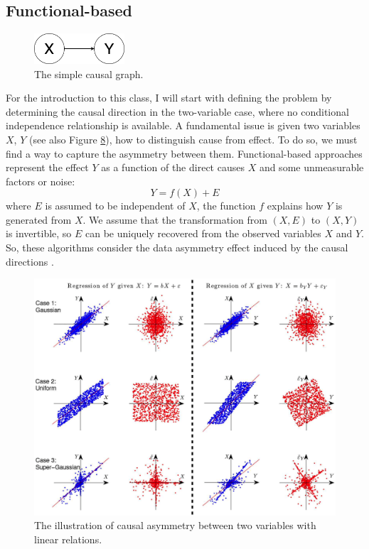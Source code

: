 \subsection{Functional-based}
\begin{figure}[H]
\centering
    \label{fig:x-y}
    \includegraphics[width=0.3\textwidth]{figures/x_y.png}
    \caption{The simple causal graph.}
\end{figure}
For the introduction to this class, I will start with defining the problem by determining the causal direction in the two-variable case, where no conditional independence relationship is available. A fundamental issue is given two variables $X$, $Y$ (see also Figure \hyperref[fig:x-y]{8}), how to distinguish cause from effect. To do so, we must find a way to capture the asymmetry between them. Functional-based approaches represent the effect $Y$ as a function of the direct causes $X$ and some unmeasurable factors or noise:
\begin{equation}
Y = f(X) + E
\end{equation}
where $E$ is assumed to be independent of $X$, the function $f$ explains how $Y$ is generated from $X$. We assume that the transformation from $(X, E)$ to $(X, Y)$ is invertible, so $E$ can be uniquely recovered from the observed variables $X$ and $Y$. So, these algorithms consider the data asymmetry effect induced by the causal directions \cite{glymour2019review}.
\begin{figure}[H]
\centering
    \label{fig:fb-example}
    \includegraphics[width=\textwidth]{figures/fb_example.png}
    \caption{The illustration of causal asymmetry between two variables with linear relations.}
\end{figure}
